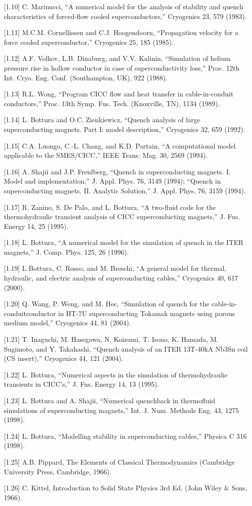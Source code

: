 [1.10] C. Marinucci, “A numerical model for the analysis of stability and quench characteristics of forced-flow cooled superconductors,” Cryogenics 23, 579 (1983).

[1.11] M.C.M. Cornellissen and C.J. Hoogendoorn, “Propagation velocity for a force
cooled superconductor,” Cryogenics 25, 185 (1985).

[1.12] A.F. Volkov, L.B. Dinaburg, and V.V. Kalinin, “Simulation of helium pressure
rise in hollow conductor in case of superconductivity loss,” Proc. 12th Int. Cryo.
Eng. Conf. (Southampton, UK), 922 (1988).

[1.13] R.L. Wong, “Program CICC flow and heat transfer in cable-in-conduit conductors,”
Proc. 13th Symp. Fus. Tech. (Knoxville, TN), 1134 (1989).

[1.14] L. Bottura and O.C. Zienkiewicz, “Quench analysis of large superconducting magnets. Part I: model description,” Cryogenics 32, 659 (1992).

[1.15] C.A. Luongo, C.-L. Chang, and K.D. Partain, “A computational model applicable
to the SMES/CICC,” IEEE Trans. Mag. 30, 2569 (1994).

[1.16] A. Shajii and J.P. Freidberg, “Quench in superconducting magnets. I. Model and
implementation,” J. Appl. Phys. 76, 3149 (1994); “Quench in superconducting
magnets. II. Analytic Solution,” J. Appl. Phys. 76, 3159 (1994).

[1.17] R. Zanino, S. De Palo, and L. Bottura, “A two-fluid code for the thermohydraulic
transient analysis of CICC superconducting magnets,” J. Fus. Energy 14,
25 (1995).

[1.18] L. Bottura, “A numerical model for the simulation of quench in the ITER magnets,”
J. Comp. Phys. 125, 26 (1996).

[1.19] L Bottura, C. Rosso, and M. Breschi, “A general model for thermal, hydraulic,
and electric analysis of superconducting cables,” Cryogenics 40, 617 (2000).

[1.20] Q. Wang, P. Weng, and M. Hec, “Simulation of quench for the cable-in-conduitconductor in HT-7U superconducting Tokamak magnets using porous medium
model,” Cryogenics 44, 81 (2004).

[1.21] T. Inaguchi, M. Hasegawa, N. Koizumi, T. Isono, K. Hamada, M. Sugimoto, and
Y. Takahashi, “Quench analysis of an ITER 13T-40kA Nb3Sn coil (CS insert),”
Cryogenics 44, 121 (2004).

[1.22] L. Bottura, “Numerical aspects in the simulation of thermohydraulic transients
in CICC’s,” J. Fus. Energy 14, 13 (1995).

[1.23] L. Bottura and A. Shajii, “Numerical quenchback in thermofluid simulations of
superconducting magnets,” Int. J. Num. Methods Eng. 43, 1275 (1998).

[1.24] L. Bottura, “Modelling stability in superconducting cables,” Physica C 316 (1998).

[1.25] A.B. Pippard, The Elements of Classical Thermodynamics (Cambridge University
Press, Cambridge, 1966).

[1.26] C. Kittel, Introduction to Solid State Physics 3rd Ed. (John Wiley \& Sons, 1966).
